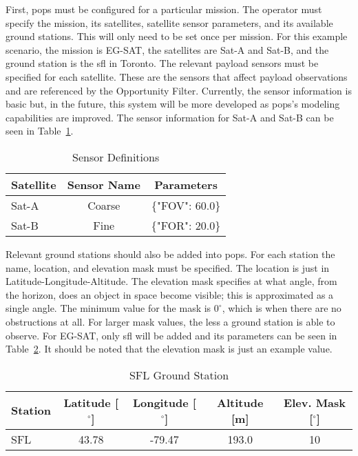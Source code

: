 First, \gls{pops} must be configured for a particular mission. The operator
must specify the mission, its satellites, satellite sensor parameters, and its
available ground stations. This will only need to be set once per mission. For
this example scenario, the mission is EG-SAT, the satellites are Sat-A and
Sat-B, and the ground station is the \gls{sfl} in Toronto. The relevant payload
sensors must be specified for each satellite. These are the sensors that affect
payload observations and are referenced by the Opportunity Filter. Currently,
the sensor information is basic but, in the future, this system will be more
developed as \gls{pops}'s modeling capabilities are improved. The sensor
information for Sat-A and Sat-B can be seen in Table~\ref{tab:sensors}. 

\begin{table}[h] 
    \centering
    \caption{Sensor Definitions}
    \begin{tabular}{ccc}
	Satellite                  & Sensor Name & Parameters    \\ \hline
	\multicolumn{1}{l|}{Sat-A} & Coarse      & \{"FOV": 60.0\} \\
	\multicolumn{1}{l|}{Sat-B} & Fine        & \{"FOR": 20.0\}
    \end{tabular}
    \label{tab:sensors}
\end{table}

Relevant ground stations should also be added into \gls{pops}. For each station
the name, location, and elevation mask must be specified. The location is just
in Latitude-Longitude-Altitude. The elevation mask specifies at what angle,
from the horizon, does an object in space become visible; this is approximated
as a single angle. The minimum value for the mask is $0^\circ$, which is when
there are no obstructions at all. For larger mask values, the less a ground
station is able to observe. For EG-SAT, only \gls{sfl} will be added and its
parameters can be seen in Table~\ref{tab:ground-stations}. It should be noted
that the elevation mask is just an example value.

\begin{table}[h] 
    \centering
    \caption{SFL Ground Station}
    \begin{tabular}{ccccc}
	Station                  & Latitude [$^\circ$] & Longitude [$^\circ$] & Altitude [m] & Elev. Mask [$^\circ$] \\ \hline
	\multicolumn{1}{l|}{SFL} & 43.78   & -79.47   & 193.0  & 10      \\
    \end{tabular}
    \label{tab:ground-stations}
\end{table}

